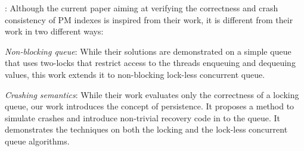 : Although the current paper aiming at verifying the
correctness and crash consistency of PM indexes is inspired from their work,
it is different from their work in two different ways:

\emph{Non-blocking queue}: While their solutions are demonstrated on a simple
queue that uses two-locks that restrict access to the threads enqueuing and
dequeuing values, this work extends it to non-blocking lock-less concurrent
queue.

\emph{Crashing semantics}: While their work evaluates only the correctness of
a locking queue, our work introduces the concept of persistence. It proposes a
method to simulate crashes and introduce non-trivial recovery code in to the
queue. It demonstrates the techniques on both the locking and the lock-less
concurrent queue algorithms.